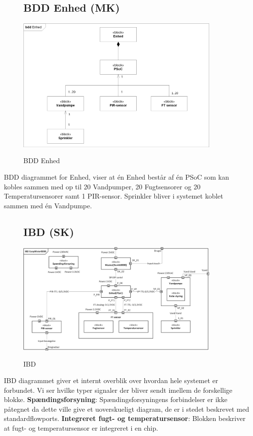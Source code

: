 \begin{figure}[H] \centering
\subsection{BDD Enhed (MK)}
{\includegraphics[width=0.9\textwidth]{filer/systemarkitektur/BDD_Enhed}}
\caption{BDD Enhed}
\label{lab:bddenhed}
\raggedright
\end{figure}
BDD diagrammet for Enhed, viser at én Enhed består af én PSoC som kan kobles sammen med op til 20 Vandpumper, 20 Fugtsensorer og 20 Temperatursensorer samt 1 PIR-sensor. Sprinkler bliver i systemet koblet sammen med én Vandpumpe.

\begin{figure}[H] \centering
\subsection{IBD (SK)}
{\includegraphics[width=0.9\textwidth]{filer/systemarkitektur/IBD}}
\caption{IBD}
\label{lab:ibd}
\raggedright
\end{figure}
IBD diagrammet giver et internt overblik over hvordan hele systemet er forbundet. Vi ser hvilke typer signaler der bliver sendt imellem de forskellige blokke. \newline \newline
\textbf{Spændingsforsyning}: Spændingsforsyningens forbindelser er ikke påtegnet da dette ville give et uoverskueligt diagram, de er i stedet beskrevet med standardflowports.  \newline \newline
\textbf{Integreret fugt- og temperatursensor}: Blokken beskriver at fugt- og temperatursensor er integreret i en chip. \newline \newline

